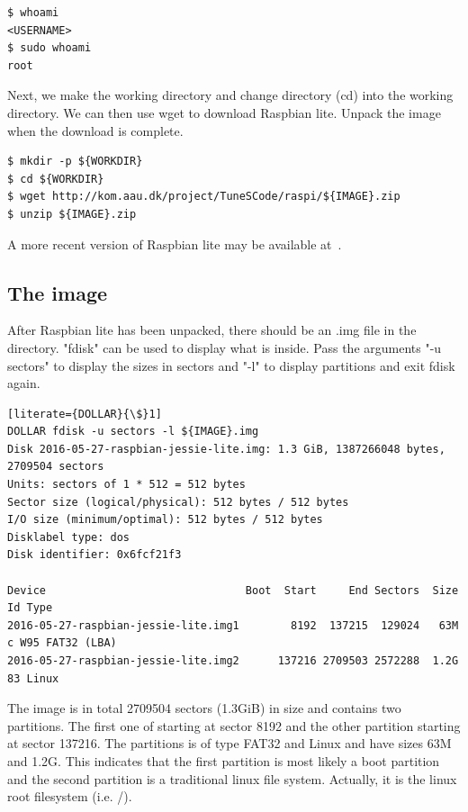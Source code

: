 \begin{lstlisting}[]
$ whoami
<USERNAME>
$ sudo whoami
root
\end{lstlisting}
\FloatBarrier
\vspace{-5mm}

Next, we make the working directory and change directory (cd) into the working
directory. We can then use wget to download Raspbian lite. Unpack the image
when the download is complete.

\begin{lstlisting}[]
$ mkdir -p ${WORKDIR}
$ cd ${WORKDIR}
$ wget http://kom.aau.dk/project/TuneSCode/raspi/${IMAGE}.zip
$ unzip ${IMAGE}.zip
\end{lstlisting}
\FloatBarrier
\vspace{-5mm}

A more recent version of Raspbian lite may be available at~\cite{raspbian}.

\subsection{The image}

After Raspbian lite has been unpacked, there should be an .img file in the directory.
"fdisk" can be used to display what is inside. Pass the arguments "-u sectors" to
display the sizes in sectors and "-l" to display partitions and exit fdisk again.

\begin{lstlisting}[literate={DOLLAR}{\$}1]
DOLLAR fdisk -u sectors -l ${IMAGE}.img
Disk 2016-05-27-raspbian-jessie-lite.img: 1.3 GiB, 1387266048 bytes, 2709504 sectors
Units: sectors of 1 * 512 = 512 bytes
Sector size (logical/physical): 512 bytes / 512 bytes
I/O size (minimum/optimal): 512 bytes / 512 bytes
Disklabel type: dos
Disk identifier: 0x6fcf21f3

Device                               Boot  Start     End Sectors  Size Id Type
2016-05-27-raspbian-jessie-lite.img1        8192  137215  129024   63M  c W95 FAT32 (LBA)
2016-05-27-raspbian-jessie-lite.img2      137216 2709503 2572288  1.2G 83 Linux
\end{lstlisting}
\FloatBarrier

The image is in total 2709504 sectors (1.3GiB) in size and contains two
partitions. The first one of starting at sector 8192 and
the other partition starting at sector 137216. The partitions is of type FAT32
and Linux and have sizes 63M and 1.2G. This indicates that the first partition
is most likely a boot partition and the second partition is a traditional linux file
system. Actually, it is the linux root filesystem (i.e. /).

